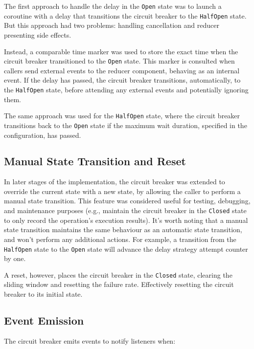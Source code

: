 The first approach to handle the delay in the \texttt{Open} state was
to launch a coroutine with a delay that transitions the circuit breaker to the \texttt{HalfOpen} state.
But this approach had two problems: handling cancellation and reducer presenting side effects.

Instead,
a comparable time marker was used to store the exact time when the circuit breaker transitioned to the \texttt{Open} state.
This marker is consulted when callers send external events to the reducer component,
behaving as an internal event.
If the delay has passed, the circuit breaker transitions, automatically, to the \texttt{HalfOpen} state,
before attending any external events and potentially ignoring them.

The same approach was used for the \texttt{HalfOpen} state,
where the circuit breaker transitions back to the \texttt{Open} state
if the maximum wait duration, specified in the configuration, has passed.

\subsection{Manual State Transition and Reset}\label{subsec:cbreaker-manual-state-transition}

In later stages of the implementation, the circuit breaker was extended to override the current state with a new state,
by allowing the caller to perform a manual state transition.
This feature was considered useful for testing, debugging,
and maintenance purposes (e.g., maintain the circuit breaker in the \texttt{Closed} state to only record the operation's execution results).
It's worth noting that a manual state transition maintains the same behaviour as an automatic state transition,
and won't perform any additional actions.
For example,
a transition from the \texttt{HalfOpen} state to the \texttt{Open} state will advance the delay strategy attempt counter by one.

A reset, however, places the circuit breaker in the \texttt{Closed} state,
clearing the sliding window and resetting the failure rate.
Effectively resetting the circuit breaker to its initial state.

\subsection{Event Emission}\label{subsec:cbreaker-event-emission}

The circuit breaker emits events to notify listeners when:

